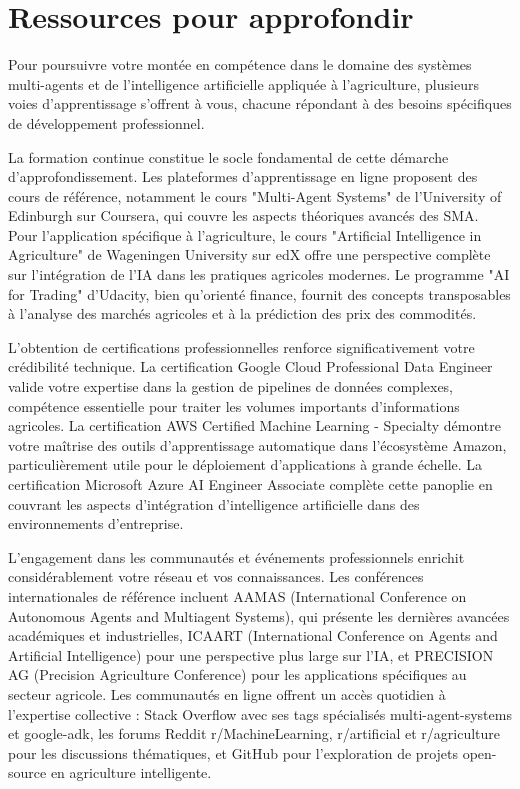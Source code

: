 \section*{Ressources pour approfondir}

Pour poursuivre votre montée en compétence dans le domaine des systèmes multi-agents et de l'intelligence artificielle appliquée à l'agriculture, plusieurs voies d'apprentissage s'offrent à vous, chacune répondant à des besoins spécifiques de développement professionnel.

La formation continue constitue le socle fondamental de cette démarche d'approfondissement. Les plateformes d'apprentissage en ligne proposent des cours de référence, notamment le cours "Multi-Agent Systems" de l'University of Edinburgh sur Coursera, qui couvre les aspects théoriques avancés des SMA. Pour l'application spécifique à l'agriculture, le cours "Artificial Intelligence in Agriculture" de Wageningen University sur edX offre une perspective complète sur l'intégration de l'IA dans les pratiques agricoles modernes. Le programme "AI for Trading" d'Udacity, bien qu'orienté finance, fournit des concepts transposables à l'analyse des marchés agricoles et à la prédiction des prix des commodités.

L'obtention de certifications professionnelles renforce significativement votre crédibilité technique. La certification Google Cloud Professional Data Engineer valide votre expertise dans la gestion de pipelines de données complexes, compétence essentielle pour traiter les volumes importants d'informations agricoles. La certification AWS Certified Machine Learning - Specialty démontre votre maîtrise des outils d'apprentissage automatique dans l'écosystème Amazon, particulièrement utile pour le déploiement d'applications à grande échelle. La certification Microsoft Azure AI Engineer Associate complète cette panoplie en couvrant les aspects d'intégration d'intelligence artificielle dans des environnements d'entreprise.

L'engagement dans les communautés et événements professionnels enrichit considérablement votre réseau et vos connaissances. Les conférences internationales de référence incluent AAMAS (International Conference on Autonomous Agents and Multiagent Systems), qui présente les dernières avancées académiques et industrielles, ICAART (International Conference on Agents and Artificial Intelligence) pour une perspective plus large sur l'IA, et PRECISION AG (Precision Agriculture Conference) pour les applications spécifiques au secteur agricole. Les communautés en ligne offrent un accès quotidien à l'expertise collective : Stack Overflow avec ses tags spécialisés multi-agent-systems et google-adk, les forums Reddit r/MachineLearning, r/artificial et r/agriculture pour les discussions thématiques, et GitHub pour l'exploration de projets open-source en agriculture intelligente.

